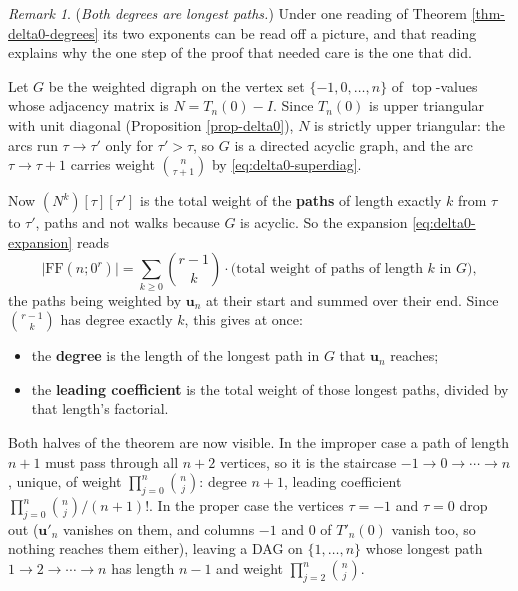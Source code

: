 \documentclass[11pt, a4paper, abstract=yes]{scrartcl}
\theoremstyle{definition}
\theoremstyle{remark}
\newtheorem{remark}[definition]{Remark}
\theoremstyle{plain}
\newcommand{\vek}[1]{\boldsymbol{#1}}
\newcommand{\tp}{\operatorname{top}}
\begin{document}
\begin{remark}
(\emph{Both degrees are longest paths.}) Under one reading of Theorem \ref{thm-delta0-degrees} its two
exponents can be read off a picture, and that reading explains why the one step of the proof that
needed care is the one that did.

Let \(G\) be the weighted digraph on the vertex set \(\lbrace-1,0,\dots,n\rbrace\) of \(\tp\)-values
whose adjacency matrix is \(N=T_n(0)-I\). Since \(T_n(0)\) is upper triangular with unit diagonal
(Proposition \ref{prop-delta0}), \(N\) is strictly upper triangular: the arcs run \(\tau\to\tau'\) only
for \(\tau'>\tau\), so \(G\) is a directed acyclic graph, and the arc \(\tau\to\tau+1\) carries weight \(\binom n{\tau+1}\) by
\eqref{eq:delta0-superdiag}.

Now \((N^k)[\tau][\tau']\) is the total weight of the \textbf{paths} of length exactly \(k\) from \(\tau\) to
\(\tau'\), paths and not walks because \(G\) is acyclic. So the expansion
\eqref{eq:delta0-expansion} reads
\begin{equation}\label{eq:delta0-paths}
  \lvert\mathrm{FF}(n;0^r)\rvert=\sum_{k\ge0}\binom{r-1}k\cdot\bigl(\text{total weight of paths of length }k\text{ in }G\bigr),
\end{equation}
the paths being weighted by \(\vek u_n\) at their start and summed over their end. Since
\(\binom{r-1}k\) has degree exactly \(k\), this gives at once:

\begin{itemize}
\item the \textbf{\textbf{degree}} is the length of the longest path in \(G\) that \(\vek u_n\) reaches;
\item the \textbf{\textbf{leading coefficient}} is the total weight of those longest paths, divided by that length's
factorial.
\end{itemize}

Both halves of the theorem are now visible. In the improper case a path of length \(n+1\) must pass
through all \(n+2\) vertices, so it is the staircase \(-1\to0\to\cdots\to n\), unique, of weight
\(\prod_{j=0}^n\binom nj\): degree \(n+1\), leading coefficient
\(\prod_{j=0}^n\binom nj\big/(n+1)!\). In the proper case the vertices \(\tau=-1\) and \(\tau=0\) drop
out (\(\vek u'_n\) vanishes on them, and columns \(-1\) and \(0\) of \(T'_n(0)\) vanish too, so nothing
reaches them either), leaving a DAG on \(\lbrace1,\dots,n\rbrace\) whose longest path
\(1\to2\to\cdots\to n\) has length \(n-1\) and weight \(\prod_{j=2}^n\binom nj\).


\end{remark}
\end{document}
